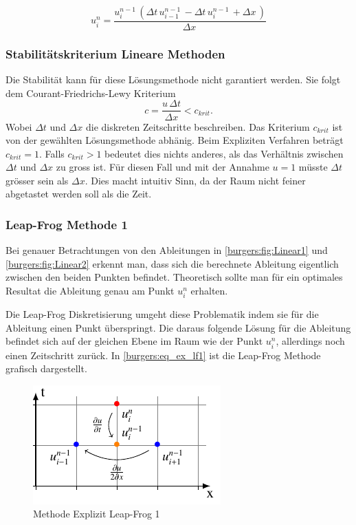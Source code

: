 	\begin{equation}
		u_{i}^{n} = \frac{u^{n-1}_{i}\, \left(\Delta{t}\, u^{n-1}_{i-1}\, - \Delta{t}\, u^{n-1}_{i}\, + \Delta{x}\,\right)}{\Delta{x}\,}
    	\label{burgers:eq_ex_sol_lin2}
	\end{equation}
	
\subsubsection{Stabilit\"atskriterium Lineare Methoden}
	Die Stabilit\"at kann f\"ur diese L\"osungsmethode nicht garantiert werden.
	Sie folgt dem Courant-Friedrichs-Lewy Kriterium
	\begin{equation}
		  c = \frac{u \, \Delta t}{\Delta x} < c_{krit}.
	\end{equation}
	Wobei $ \Delta t$ und $\Delta x$ die diskreten Zeitschritte beschreiben.
	Das Kriterium $c_{krit}$ ist von der gew\"ahlten L\"osungsmethode abh\"anig.
	Beim Expliziten Verfahren beträgt $c_{krit} = 1$.
	Falls $c_{krit} > 1$ bedeutet dies nichts anderes, als das Verh\"altnis zwischen $ \Delta t$ und $\Delta x$ zu gross ist.
	F\"ur diesen Fall und mit der Annahme $u = 1$ m\"usste $ \Delta t$ gr\"osser sein als $\Delta x$.
	Dies macht intuitiv Sinn, da der Raum nicht feiner abgetastet werden soll als die Zeit.
	
	
	
\subsubsection{Leap-Frog Methode 1}
	
	Bei genauer Betrachtungen von den Ableitungen in \ref{burgers:fig:Linear1} und \ref{burgers:fig:Linear2} erkennt man, dass sich die berechnete Ableitung eigentlich zwischen den beiden Punkten befindet.
	Theoretisch sollte man für ein optimales Resultat die Ableitung genau am Punkt $u_{i}^{n}$ erhalten.
	
	\medskip
	Die Leap-Frog Diskretisierung umgeht diese Problematik indem sie f\"ur die Ableitung einen Punkt \"uberspringt.
	Die daraus folgende L\"osung für die Ableitung befindet sich auf der gleichen Ebene im Raum wie der Punkt $u_{i}^{n}$, allerdings noch einen Zeitschritt zurück.
	In \ref{burgers:eq_ex_lf1} ist die Leap-Frog Methode grafisch dargestellt.
	
	
	\begin{figure}[!ht]
	\centering
	\includegraphics[height=.4\textwidth]{papers/burgers/BurgersEquation/tikz/Linear3/Linear3.pdf}
	\caption{Methode Explizit Leap-Frog 1}
	\label{burgers:fig:Linear3}
	\end{figure}
	
